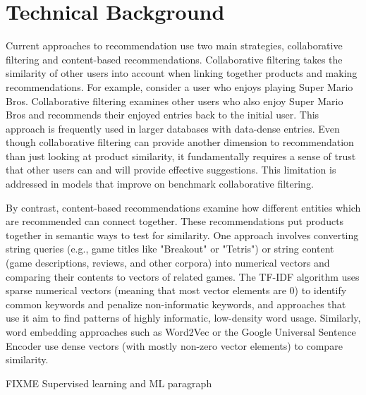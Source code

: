 \documentclass[10pt,twocolumn]{article}
\begin{document}
\section{Technical Background}
Current approaches to recommendation use two main strategies, collaborative filtering and content-based recommendations.
Collaborative filtering takes the similarity of other users
into account when linking together products and making
recommendations. For example, consider a user who enjoys playing Super Mario Bros. Collaborative filtering examines other users who also enjoy Super Mario Bros and
recommends their enjoyed entries back to the initial user.
This approach is frequently used in larger databases with
data-dense entries. Even though collaborative
filtering can provide another dimension to recommendation
than just looking at product similarity, it fundamentally requires a sense of trust that other users can and will provide
effective suggestions. This limitation is addressed in models that improve on benchmark collaborative filtering.


By contrast, content-based recommendations examine
how different entities which are recommended can connect
together. These recommendations put products together in
semantic ways to test for similarity. One approach
involves converting string queries (e.g., game titles like "Breakout" or "Tetris") or string content (game descriptions, reviews, and other corpora) into numerical vectors and comparing their contents to vectors of related games. The TF-IDF algorithm uses sparse numerical vectors (meaning that most vector elements are 0) to identify common keywords and penalize non-informatic keywords, and approaches that use it aim to find patterns of highly informatic, low-density word usage. \cite{Meidl, Zhang, DWang} Similarly, word embedding approaches such as Word2Vec \cite{Word2Vec} or the Google Universal Sentence Encoder \cite{SentenceEncoder} use dense vectors (with mostly non-zero vector elements) to compare similarity.

FIXME Supervised learning and ML paragraph



\end{document}
